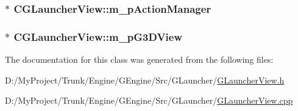 \subsubsection[{m\+\_\+p\+Action\+Manager}]{$\ast$ C\+G\+Launcher\+View\+::m\+\_\+p\+Action\+Manager\hspace{0.3cm}{\ttfamily [protected]}}\label{class_c_g_launcher_view_a7094207897d480dffe7a8799e271e977}
\hypertarget{class_c_g_launcher_view_ab8b03252d6cd3ee373ab2719f53978a1}{}
\subsubsection[{m\+\_\+p\+G3\+D\+View}]{$\ast$ C\+G\+Launcher\+View\+::m\+\_\+p\+G3\+D\+View\hspace{0.3cm}{\ttfamily [protected]}}\label{class_c_g_launcher_view_ab8b03252d6cd3ee373ab2719f53978a1}


The documentation for this class was generated from the following files\+:\begin{DoxyCompactItemize}
\item 
D\+:/\+My\+Project/\+Trunk/\+Engine/\+G\+Engine/\+Src/\+G\+Launcher/\hyperlink{_g_launcher_view_8h}{G\+Launcher\+View.\+h}\item 
D\+:/\+My\+Project/\+Trunk/\+Engine/\+G\+Engine/\+Src/\+G\+Launcher/\hyperlink{_g_launcher_view_8cpp}{G\+Launcher\+View.\+cpp}\end{DoxyCompactItemize}

